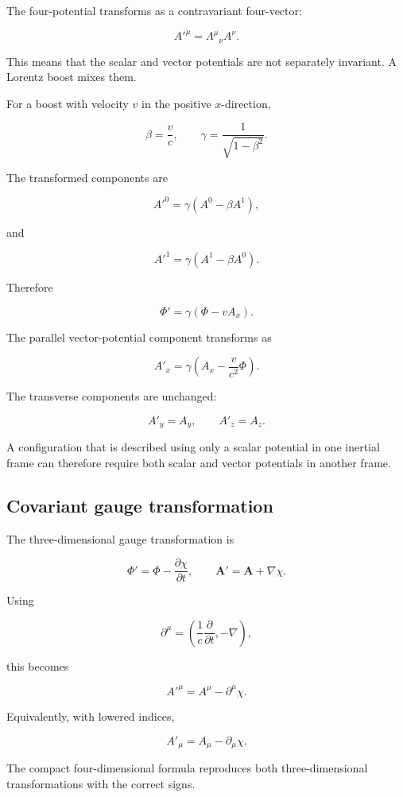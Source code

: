 The four-potential transforms as a contravariant four-vector:

\[
\boxed{
A'^{\mu}
=
\Lambda^{\mu}{}_{\nu}A^{\nu}
}.
\]

This means that the scalar and vector potentials are not separately invariant. A Lorentz boost mixes them.

For a boost with velocity \(v\) in the positive \(x\)-direction,

\[
\beta
=
\frac{v}{c},
\qquad
\gamma
=
\frac{1}{\sqrt{1-\beta^2}}.
\]

The transformed components are

\[
A'^0
=
\gamma
\left(
A^0-
\beta A^1
\right),
\]

and

\[
A'^1
=
\gamma
\left(
A^1-
\beta A^0
\right).
\]

Therefore

\[
\boxed{
\Phi'
=
\gamma
\left(
\Phi-vA_x
\right)
}.
\]

The parallel vector-potential component transforms as

\[
\boxed{
A'_x
=
\gamma
\left(
A_x-
\frac{v}{c^2}\Phi
\right)
}.
\]

The transverse components are unchanged:

\[
A'_y=A_y,
\qquad
A'_z=A_z.
\]

A configuration that is described using only a scalar potential in one inertial frame can therefore require both scalar and vector potentials in another frame.

\subsection{Covariant gauge transformation}

The three-dimensional gauge transformation is

\[
\Phi'
=
\Phi-
\frac{\partial\chi}{\partial t},
\qquad
\mathbf{A}'
=
\mathbf{A}+
\nabla\chi.
\]

Using

\[
\partial^{\mu}
=
\left(
\frac{1}{c}
\frac{\partial}{\partial t},
-\nabla
\right),
\]

this becomes

\[
\boxed{
A'^{\mu}
=
A^{\mu}
-
\partial^{\mu}\chi
}.
\]

Equivalently, with lowered indices,

\[
\boxed{
A'_{\mu}
=
A_{\mu}
-
\partial_{\mu}\chi
}.
\]

The compact four-dimensional formula reproduces both three-dimensional transformations with the correct signs.

